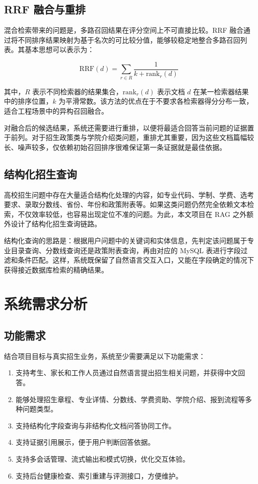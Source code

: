 \documentclass[UTF8,zihao=-4,oneside,fontset=windows]{ctexbook}
\numberwithin{equation}{chapter}
\begin{document}
\subsection{RRF 融合与重排}
混合检索带来的问题是，多路召回结果在评分空间上不可直接比较。RRF 融合通过将不同排序结果映射为基于名次的可比较分值，能够较稳定地整合多路召回列表\cite{cormack2009rrf}。其基本思想可以表示为：

\begin{equation}
\mathrm{RRF}(d)=\sum_{r \in R}\frac{1}{k+\mathrm{rank}_{r}(d)}
\end{equation}

其中，$R$ 表示不同检索器的结果集合，$\mathrm{rank}_{r}(d)$ 表示文档 $d$ 在某一检索器结果中的排序位置，$k$ 为平滑常数。该方法的优点在于不要求各检索器得分分布一致，适合工程场景中的异构召回融合。

对融合后的候选结果，系统还需要进行重排，以便将最适合回答当前问题的证据置于前列。对于招生政策类与学院介绍类问题，重排尤其重要，因为这些文档篇幅较长、噪声较多，仅依赖初始召回排序很难保证第一条证据就是最佳依据。

\subsection{结构化招生查询}
高校招生问题中存在大量适合结构化处理的内容，如专业代码、学制、学费、选考要求、录取分数线、省份、年份和政策附表等。如果这类问题仍然完全依赖文本检索，不仅效率较低，也容易出现定位不准的问题。为此，本文项目在 RAG 之外额外设计了结构化招生查询链路。

结构化查询的思路是：根据用户问题中的关键词和实体信息，先判定该问题属于专业目录查询、分数线查询还是政策附表查询，再由对应的 MySQL 表进行字段过滤和条件匹配。这样，系统既保留了自然语言交互入口，又能在字段确定的情况下获得接近数据库检索的精确结果。

\section{系统需求分析}
\subsection{功能需求}
结合项目目标与真实招生业务，系统至少需要满足以下功能需求：

\begin{enumerate}
  \item 支持考生、家长和工作人员通过自然语言提出招生相关问题，并获得中文回答。
  \item 能够处理招生章程、专业详情、分数线、学费资助、学院介绍、报到流程等多种问题类型。
  \item 支持结构化字段查询与非结构化文档问答协同工作。
  \item 支持证据引用展示，便于用户判断回答依据。
  \item 支持多会话管理、流式输出和模式切换，优化交互体验。
  \item 支持后台健康检查、索引重建与评测接口，方便维护。
\end{enumerate}
\end{document}
